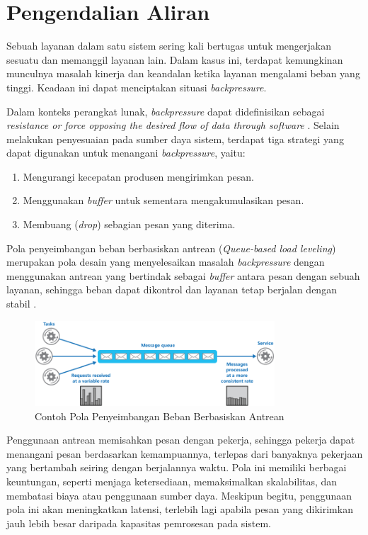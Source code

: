 \section{Pengendalian Aliran}

Sebuah layanan dalam satu sistem sering kali bertugas untuk mengerjakan sesuatu dan memanggil layanan lain. Dalam kasus ini, terdapat kemungkinan munculnya masalah kinerja dan keandalan ketika layanan mengalami beban yang tinggi. Keadaan ini dapat menciptakan situasi \textit{backpressure}.

Dalam konteks perangkat lunak, \textit{backpressure} dapat didefinisikan sebagai \textit{resistance or force opposing the desired flow of data through software} \parencite{backpressureExplained}. Selain melakukan penyesuaian pada sumber daya sistem, terdapat tiga strategi yang dapat digunakan untuk menangani \textit{backpressure}, yaitu:

\begin{enumerate}
    \item Mengurangi kecepatan produsen mengirimkan pesan.
    \item Menggunakan \textit{buffer} untuk sementara mengakumulasikan pesan.
    \item Membuang (\textit{drop}) sebagian pesan yang diterima.
\end{enumerate}

Pola penyeimbangan beban berbasiskan antrean (\textit{Queue-based load leveling}) merupakan pola desain yang menyelesaikan masalah \textit{backpressure} dengan menggunakan antrean yang bertindak sebagai \textit{buffer} antara pesan dengan sebuah layanan, sehingga beban dapat dikontrol dan layanan tetap berjalan dengan stabil \parencite{queueLoadLeveling}.

\begin{figure}[htbp]
    \centering
    \includegraphics[width=0.8\textwidth]{resources/chapter-2/queue-based-load-leveling-pattern.png}
    \caption{Contoh Pola Penyeimbangan Beban Berbasiskan Antrean \parencite{queueLoadLeveling}}
    \label{fig:queue-based-load-leveling-pattern}
\end{figure}

Penggunaan antrean memisahkan pesan dengan pekerja, sehingga pekerja dapat menangani pesan berdasarkan kemampuannya, terlepas dari banyaknya pekerjaan yang bertambah seiring dengan berjalannya waktu. Pola ini memiliki berbagai keuntungan, seperti menjaga ketersediaan, memaksimalkan skalabilitas, dan membatasi biaya atau penggunaan sumber daya. Meskipun begitu, penggunaan pola ini akan meningkatkan latensi, terlebih lagi apabila pesan yang dikirimkan jauh lebih besar daripada kapasitas pemrosesan pada sistem.